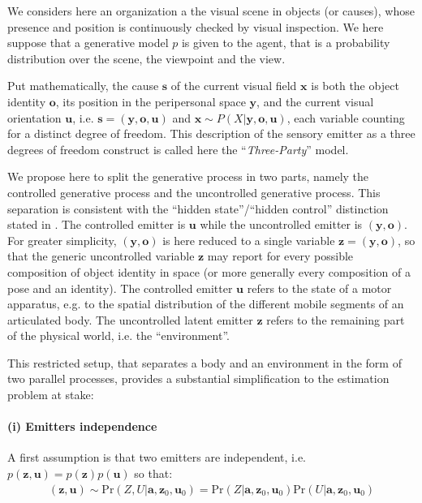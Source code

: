 \documentclass[12pt,twoside,openright]{article}
\begin{document}
We considers here an organization a the visual scene in objects (or causes), whose presence and position is continuously checked by visual inspection. 
We here suppose that a generative model $p$ is given to the agent, that is a probability distribution over the scene, the viewpoint and the view.

Put mathematically, the cause $\boldsymbol{s}$ of the current visual field $\boldsymbol{x}$ is both the object identity $\boldsymbol{o}$, its position in the peripersonal space $\boldsymbol{y}$, and the current visual orientation $\boldsymbol{u}$, i.e. $\boldsymbol{s} = (\boldsymbol{y},\boldsymbol{o},\boldsymbol{u})$ and $\boldsymbol{x} \sim P(X|\boldsymbol{y},\boldsymbol{o},\boldsymbol{u})$, each variable counting for a distinct degree of freedom. This description of the sensory emitter as a three degrees of freedom construct is called here the ``\emph{Three-Party}'' model.

We propose here to split the generative process in two parts, namely the controlled generative process and the uncontrolled generative process. 
This separation 
is consistent with the ``hidden state''/``hidden control'' distinction stated in \cite{friston2012perceptions}.
The controlled emitter is $\boldsymbol{u}$ while the uncontrolled emitter is  $(\boldsymbol{y}, \boldsymbol{o})$. 
For greater simplicity, $(\boldsymbol{y},\boldsymbol{o})$ is here reduced to a single variable $\boldsymbol{z} = (\boldsymbol{y}, \boldsymbol{o})$, 
so that the generic uncontrolled variable $\boldsymbol{z}$ may report for every possible composition of object identity in space (or more generally every composition of a pose and an identity).
The controlled emitter $\boldsymbol{u}$ refers to the state of a motor apparatus, e.g. to the spatial distribution of the different mobile segments of an articulated body. The uncontrolled latent emitter $\boldsymbol{z}$  refers to the remaining part of the physical world, i.e. the ``environment''. 

This restricted setup, that separates a body and an environment in the form of two parallel processes,  provides a substantial simplification to the estimation problem at stake: 
\paragraph{(i) Emitters independence}
A first assumption is that two emitters are independent, i.e. $p(\boldsymbol{z}, \boldsymbol{u}) = p(\boldsymbol{z})p(\boldsymbol{u})$ so that:
\begin{align}
(\boldsymbol{z},\boldsymbol{u}) \sim \text{Pr}(Z,U|\boldsymbol{a}, \boldsymbol{z}_0, \boldsymbol{u}_0) = \text{Pr}(Z|\boldsymbol{a}, \boldsymbol{z}_0, \boldsymbol{u}_0) \text{Pr}(U|\boldsymbol{a}, \boldsymbol{z}_0, \boldsymbol{u}_0)\nonumber
\end{align}
	
\end{document}
